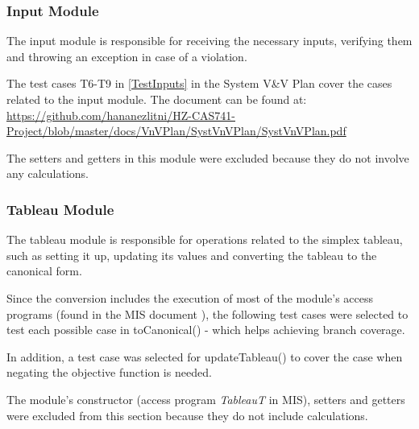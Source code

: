 \documentclass[12pt, titlepage]{article}
\begin{document}
\subsubsection{Input Module}

The input module is responsible for receiving the necessary inputs, verifying 
them and throwing an exception in case of a violation.

The test cases T6-T9 in \ref{TestInputs} in the System V\&V Plan cover the 
cases related to the input module. The document can be found at: 
\url{https://github.com/hananezlitni/HZ-CAS741-Project/blob/master/docs/VnVPlan/SystVnVPlan/SystVnVPlan.pdf}

The setters and getters in this module were excluded because they do not 
involve any calculations.


\subsubsection{Tableau Module}

The tableau module is responsible for operations related to the simplex 
tableau, such as setting it up, updating its values and converting the tableau 
to the canonical form. 

Since the conversion includes the execution of most of the module's access 
programs (found in the MIS document \cite{losms-mis}), the following test cases 
were selected to test each possible case in toCanonical() - which helps 
achieving branch coverage.

In addition, a test case was selected for updateTableau() to cover the case 
when negating the objective function is needed.

The module's constructor (access program \textit{TableauT} in MIS), setters 
and getters were excluded from this section because they do not include 
calculations.
\end{document}
